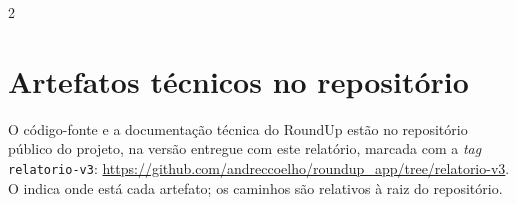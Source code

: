 \begin{apendicesenv}
{\small\SingleSpacing
\setlength{\columnsep}{0.8cm}
\begin{multicols}{2}

\end{multicols}
}

\chapter{Artefatos técnicos no repositório}
\label{ap:artefatos}

O código-fonte e a documentação técnica do RoundUp estão no repositório
público do projeto, na versão entregue com este relatório, marcada com a
\textit{tag} \texttt{relatorio-v3}:
\url{https://github.com/andreccoelho/roundup_app/tree/relatorio-v3}.
O  indica onde está cada artefato; os caminhos são
relativos à raiz do repositório.


\end{apendicesenv}
